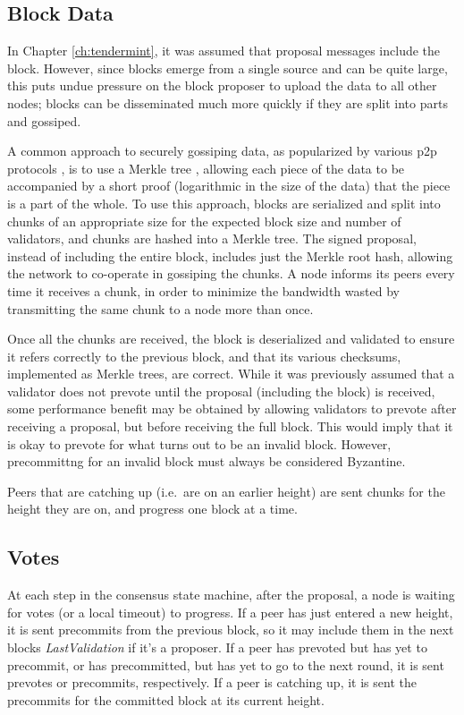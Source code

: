 \subsection{Block Data}
In Chapter \ref{ch:tendermint}, it was assumed that proposal messages include the block.
However, since blocks emerge from a single source and can be quite large, 
this puts undue pressure on the block proposer to upload the data to all other nodes;
blocks can be disseminated much more quickly if they are split into parts and gossiped.

A common approach to securely gossiping data, as popularized by various p2p protocols \cite{bittorrent,libswift}, 
is to use a Merkle tree \cite{Merkle1987digital},
allowing each piece of the data to be accompanied by a short proof (logarithmic in the size of the data)
that the piece is a part of the whole. 
To use this approach, 
blocks are serialized and split into chunks of an appropriate size 
for the expected block size and number of validators,
and chunks are hashed into a Merkle tree. 
The signed proposal, instead of including the entire block, includes just the Merkle root hash,
allowing the network to co-operate in gossiping the chunks.
A node informs its peers every time it receives a chunk, 
in order to minimize the bandwidth wasted by transmitting the same chunk to a node more than once.

Once all the chunks are received, the block is deserialized and validated to ensure it refers correctly to the previous 
block, and that its various checksums, implemented as Merkle trees, are correct. 
While it was previously assumed that a validator does not prevote until the proposal (including the block) is received,
some performance benefit may be obtained by allowing validators to prevote after receiving a proposal, 
but before receiving the full block. This would imply that it is okay to prevote for what turns out to be an invalid block.
However, precommittng for an invalid block must always be considered Byzantine.

Peers that are catching up (i.e.~are on an earlier height) are sent chunks for the height they are on,
and progress one block at a time.

\subsection{Votes}

At each step in the consensus state machine, after the proposal, a node is waiting for votes (or a local timeout) to progress.
If a peer has just entered a new height, it is sent precommits from the previous block,
so it may include them in the next blocks \emph{LastValidation} if it's a proposer.
If a peer has prevoted but has yet to precommit, or has precommitted, but has yet to go to the next round,
it is sent prevotes or precommits, respectively.
If a peer is catching up, it is sent the precommits for the committed block at its current height.

